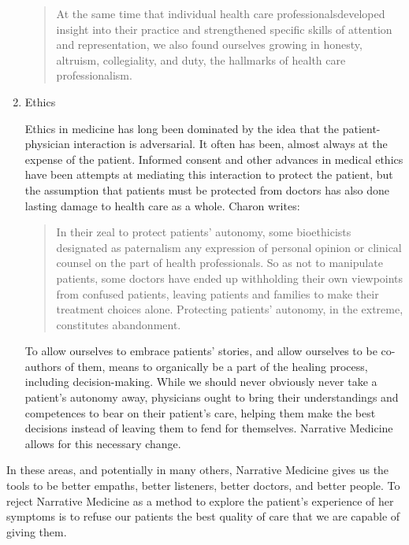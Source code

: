 \documentclass[doc,12pt]{apa6}
\begin{document}
\begin{enumerate}
\begin{quote}
	At the same time that individual health care professionalsdeveloped
	insight into their practice and strengthened specific skills of attention
	and representation, we also found ourselves growing in honesty, altruism,
	collegiality, and duty, the hallmarks of health care professionalism.
	\cite[p.~225]{Charon06}
\end{quote}

\item
  Ethics

  Ethics in medicine has long been dominated by the idea that the
  patient-physician interaction is adversarial. It often has been, almost
  always at the expense of the patient. Informed consent and other advances in
  medical ethics have been attempts at mediating this interaction to protect
  the patient, but the assumption that patients must be protected from doctors
  has also done lasting damage to health care as a whole. Charon writes:

\begin{quote}
	In their zeal to protect patients' autonomy, some bioethicists designated
	as paternalism any expression of personal opinion or clinical counsel on
	the part of health professionals. So as not to manipulate patients, some
	doctors have ended up withholding their own viewpoints from confused
	patients, leaving patients and families to make their treatment choices
	alone. Protecting patients' autonomy, in the extreme, constitutes
	abandonment. \cite[p.~206]{Charon06}
\end{quote}

  To allow ourselves to embrace patients' stories, and allow ourselves to be
  co-authors of them, means to organically be a part of the healing process,
  including decision-making. While we should never obviously never take a
  patient's autonomy away, physicians ought to bring their understandings and
  competences to bear on their patient's care, helping them make the best
  decisions instead of leaving them to fend for themselves. Narrative Medicine
  allows for this necessary change.
\end{enumerate}

In these areas, and potentially in many others, Narrative Medicine gives us the
tools to be better empaths, better listeners, better doctors, and better
people. To reject Narrative Medicine as a method to explore the patient's
experience of her symptoms is to refuse our patients the best quality of care
that we are capable of giving them.



\end{document}
